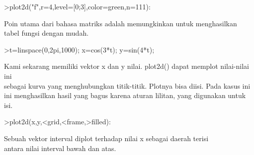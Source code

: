 \documentclass{article}
\begin{document}
\begin{eulernotebook}
\begin{eulercomment}
\begin{eulercomment}
\begin{eulercomment}
\begin{eulercomment}
\begin{eulerprompt}
>plot2d("f",r=4,level=[0;3],color=green,n=111):
\end{eulerprompt}
\begin{eulercomment}
Poin utama dari bahasa matriks adalah memungkinkan untuk menghasilkan
tabel fungsi dengan mudah.
\end{eulercomment}
\begin{eulerprompt}
>t=linspace(0,2pi,1000); x=cos(3*t); y=sin(4*t);
\end{eulerprompt}
\begin{eulercomment}
Kami sekarang memiliki vektor x dan y nilai. plot2d() dapat memplot
nilai-nilai ini\\
sebagai kurva yang menghubungkan titik-titik. Plotnya bisa diisi. Pada
kasus ini\\
ini menghasilkan hasil yang bagus karena aturan lilitan, yang
digunakan untuk\\
isi.
\end{eulercomment}
\begin{eulerprompt}
>plot2d(x,y,<grid,<frame,>filled):
\end{eulerprompt}
\begin{eulercomment}
Sebuah vektor interval diplot terhadap nilai x sebagai daerah terisi\\
antara nilai interval bawah dan atas.


\end{eulercomment}
\end{eulercomment}
\end{eulercomment}
\end{eulercomment}
\end{eulercomment}
\end{eulernotebook}
\end{document}
